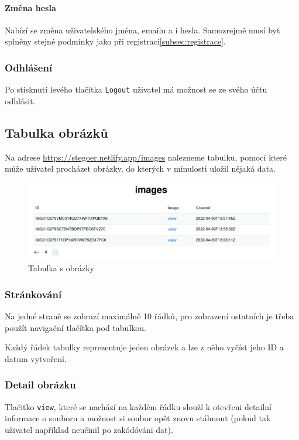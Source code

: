 \paragraph{Změna hesla}

Nabízí se změna uživatelského jména, emailu a i hesla.
Samozrejmě musí byt splněny stejné podmínky jako při
registraci\ref{subsec:registrace}.

\subsubsection{Odhlášení}

Po stisknutí levého tlačítka \texttt{Logout} uživatel má možnost se ze svého
účtu odhlásit.

\subsection{Tabulka obrázků}\label{subsec:tabulka-obrazku}
Na adrese \url{https://stegoer.netlify.app/images} nalezneme tabulku, pomocí
které může uživatel procházet obrázky, do kterých v minulosti uložil nějaká
data.

\begin{figure}
    \centering
    \includegraphics[scale=0.5]{assets/images/images-table}
    \caption{Tabulka s obrázky}\label{fig:tabulka-obrazky}
\end{figure}

\subsubsection{Stránkování}\label{subsubsec:strankovani}
Na jedné straně se zobrazí maximálně 10 řádků, pro zobrazení ostatních je třeba
použít navigační tlačítka pod tabulkou.

Každý řádek tabulky reprezentuje jeden obrázek a lze z něho vyčíst jeho ID a
datum vytvoření.

\subsubsection{Detail obrázku}\label{subsubsec:detail-obrazku}
Tlačitko \texttt{view}, které se nachází na každém řádku slouží k otevřeni
detailní informace o souboru a možnost si soubor opět znovu stáhnout
(pokud tak uživatel například neučinil po zakódóváni dat).

